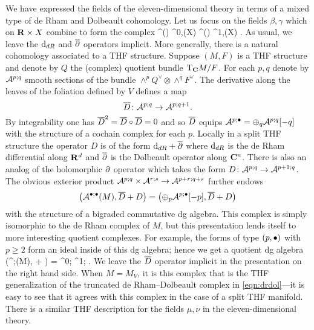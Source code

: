 We have expressed the fields of the eleven-dimensional theory in terms of a mixed type of de Rham and Dolbeault cohomology.
Let us focus on the fields $\beta,\gamma$ which on $\mathbf{R} \times X$ combine to form the complex
\beqn\label{eqn:drdol}
\Omega^{\bu}(\R) \otimes \Omega^{0,\bu}(X) \xto{1 \otimes \del} \Omega^{\bu}(\R) \otimes \Omega^{1,\bu}(X) .
\eeqn
As usual, we leave the ${\rm d}_{dR}$ and $\overline{\partial}$ operators implicit.
More generally, there is a natural cohomology associated to a THF structure.
Suppose $(M,F)$ is a THF structure and
denote by $Q$ the (complex) quotient bundle ${\rm T}_{\mathbf{C}} M / F$.
For each $p,q$ denote by $\mathcal A^{p;q}$ smooth sections of the bundle $\wedge^p Q^\vee \otimes \wedge^q F^\vee$.
The derivative along the leaves of the foliation defined by $V$ defines a map
\[
\overline{D} \colon \mathcal A^{p;q} \to \mathcal A^{p;q+1}  .
\]
By integrability one has $\overline{D}^2 = \overline{D} \circ \overline{D} = 0$ and so $\overline{D}$ equips $\mathcal A^{p;\bullet} = \oplus_q \mathcal A^{p;q}[-q]$ with the structure of a cochain complex for each $p$.
Locally in a split THF structure the operator $D$ is of the form ${\rm d}_{dR} + \overline{\partial}$ where ${\rm d}_{dR}$ is the de Rham differential along $\mathbf{R}^d$ and $\overline{\partial}$ is the Dolbeault operator along $\mathbf{C}^n$.
There is also an analog of the holomorphic $\partial$ operator which takes the form $D \colon \mathcal A^{p;q} \to \mathcal A^{p+1;q}$.
The obvious exterior product $\mathcal A^{p;q} \times \mathcal A^{r;s} \to \mathcal A^{p+r;q+s}$ further endows
\[
\left(\mathcal A^{\bullet;\bullet} (M), \overline{D} + D\right) = \left(\oplus_p \mathcal A^{p;\bullet}[-p] , \overline{D} + D \right)
\]
with the structure of a bigraded commutative dg algebra.
This complex is simply isomorphic to the de Rham complex of $M$, but this presentation lends itself to more interesting quotient complexes.
For example, the forms of type $(p,\bullet)$ with $p \geq 2$ form an ideal inside of this dg algebra; hence we get a quotient dg algebra
\beqn\label{thfcoh1}
\left(\cA^{;\bu}(M), \thfd + \thfdel\right) = \quad \cA^{0;\bu} \xto{\thfdel} \cA^{1;\bu} .
\eeqn
We leave the $\overline{D}$ operator implicit in the presentation on the right hand side.
When $M = M_V$, it is this complex that is the THF generalization of the truncated de Rham--Dolbeault complex in \eqref{eqn:drdol}---it is easy to see that it agrees with this complex in the case of a split THF manifold.
There is a similar THF description for the fields $\mu,\nu$ in the eleven-dimensional theory.

